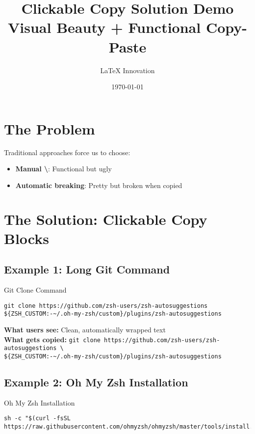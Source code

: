 \documentclass{article}
\title{Clickable Copy Solution Demo\\
\large Visual Beauty + Functional Copy-Paste}
\author{LaTeX Innovation}
\date{\today}
\begin{document}
\maketitle

\section{The Problem}

Traditional approaches force us to choose:
\begin{itemize}
    \item \textbf{Manual \textbackslash}: Functional but ugly
    \item \textbf{Automatic breaking}: Pretty but broken when copied
\end{itemize}

\section{The Solution: Clickable Copy Blocks}

\subsection{Example 1: Long Git Command}

\begin{clickablecode}{Git Clone Command}
\begin{lstlisting}
git clone https://github.com/zsh-users/zsh-autosuggestions ${ZSH_CUSTOM:-~/.oh-my-zsh/custom}/plugins/zsh-autosuggestions
\end{lstlisting}
\end{clickablecode}

\textbf{What users see:} Clean, automatically wrapped text\\
\textbf{What gets copied:} \texttt{git clone https://github.com/zsh-users/zsh-autosuggestions \textbackslash\\
\phantom{What gets copied: }\$\{ZSH\_CUSTOM:-\textasciitilde/.oh-my-zsh/custom\}/plugins/zsh-autosuggestions}

\subsection{Example 2: Oh My Zsh Installation}

\begin{clickablecode}{Oh My Zsh Installation}
\begin{lstlisting}
sh -c "$(curl -fsSL https://raw.githubusercontent.com/ohmyzsh/ohmyzsh/master/tools/install.sh)"
\end{lstlisting}
\end{clickablecode}
\end{document}
